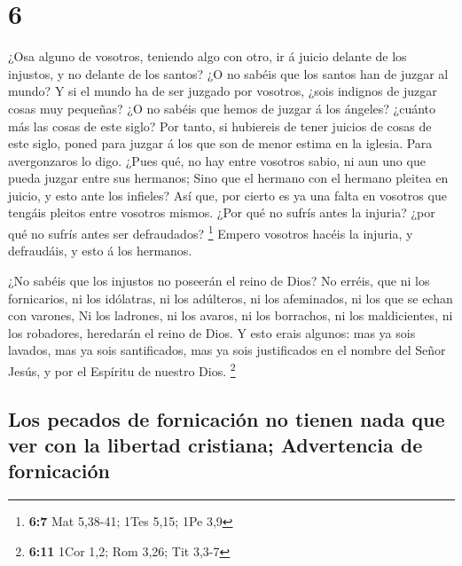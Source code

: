 \hypertarget{section-5}{%
\section{6}\label{section-5}}

 ¿Osa alguno de vosotros, teniendo algo con otro, ir á
juicio delante de los injustos, y no delante de los santos? 
¿O no sabéis que los santos han de juzgar al mundo? Y si el mundo ha de
ser juzgado por vosotros, ¿sois indignos de juzgar cosas muy pequeñas?
 ¿O no sabéis que hemos de juzgar á los ángeles? ¿cuánto más
las cosas de este siglo?  Por tanto, si hubiereis de tener
juicios de cosas de este siglo, poned para juzgar á los que son de menor
estima en la iglesia.  Para avergonzaros lo digo. ¿Pues qué,
no hay entre vosotros sabio, ni aun uno que pueda juzgar entre sus
hermanos;  Sino que el hermano con el hermano pleitea en
juicio, y esto ante los infieles?  Así que, por cierto es ya
una falta en vosotros que tengáis pleitos entre vosotros mismos. ¿Por
qué no sufrís antes la injuria? ¿por qué no sufrís antes ser
defraudados? \footnote{\textbf{6:7} Mat 5,38-41; 1Tes 5,15; 1Pe 3,9}
 Empero vosotros hacéis la injuria, y defraudáis, y esto á
los hermanos.

 ¿No sabéis que los injustos no poseerán el reino de Dios?
No erréis, que ni los fornicarios, ni los idólatras, ni los adúlteros,
ni los afeminados, ni los que se echan con varones,  Ni los
ladrones, ni los avaros, ni los borrachos, ni los maldicientes, ni los
robadores, heredarán el reino de Dios.  Y esto erais
algunos: mas ya sois lavados, mas ya sois santificados, mas ya sois
justificados en el nombre del Señor Jesús, y por el Espíritu de nuestro
Dios. \footnote{\textbf{6:11} 1Cor 1,2; Rom 3,26; Tit 3,3-7}

\hypertarget{los-pecados-de-fornicaciuxf3n-no-tienen-nada-que-ver-con-la-libertad-cristiana-advertencia-de-fornicaciuxf3n}{%
\subsection{Los pecados de fornicación no tienen nada que ver con la
libertad cristiana; Advertencia de
fornicación}\label{los-pecados-de-fornicaciuxf3n-no-tienen-nada-que-ver-con-la-libertad-cristiana-advertencia-de-fornicaciuxf3n}}

